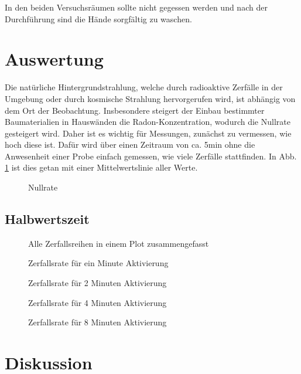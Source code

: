 \documentclass[12pt,a4paper,titlepage,headinclude,bibtotoc]{scrartcl}
\begin{document}
In den beiden Versuchsräumen sollte nicht gegessen werden und nach der Durchführung sind die Hände sorgfältig zu waschen.


\section{Auswertung}
\label{sec:auswertung}

Die natürliche Hintergrundstrahlung, welche durch radioaktive Zerfälle in der Umgebung oder durch kosmische Strahlung hervorgerufen wird, ist abhängig von dem Ort der Beobachtung.
Insbesondere steigert der Einbau bestimmter Baumaterialien in Hauswänden die Radon-Konzentration, wodurch die Nullrate gesteigert wird.
Daher ist es wichtig für Messungen, zunächst zu vermessen, wie hoch diese ist.
Dafür wird über einen Zeitraum von ca. 5min ohne die Anwesenheit einer Probe einfach gemessen, wie viele Zerfälle stattfinden.
In Abb. \ref{fig:null} ist dies getan mit einer Mittelwertslinie aller Werte.

\begin{figure}[h]
	\centering
	
	\caption{Nullrate}
	\label{fig:null}
\end{figure}

\subsection{Halbwertszeit}
\begin{figure}[h]
\centering

\caption{Alle Zerfallsreihen in einem Plot zusammengefasst}
\label{fig:alle}
\end{figure}
\begin{figure}[h]
\centering

\caption{Zerfallsrate für ein Minute Aktivierung}
\label{fig:1min}
\end{figure}

\begin{figure}[h]
\centering

\caption{Zerfallsrate für 2 Minuten Aktivierung}
\label{fig:2min}
\end{figure}

\begin{figure}[h]
\centering

\caption{Zerfallsrate für 4 Minuten Aktivierung}
\label{fig:4min}
\end{figure}


\begin{figure}[h]
\centering

\caption{Zerfallsrate für 8 Minuten Aktivierung}
\label{fig:8min}
\end{figure}





\section{Diskussion}
\label{sec:diskussion}



\end{document}
